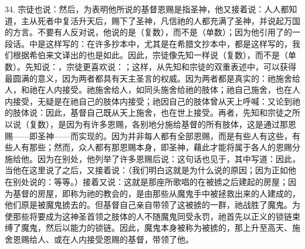 34. 宗徒也说：然后，为表明他所说的基督恩赐是指圣神，他又接着说：人人都知道，主从死者中复活升天后，赐下了圣神，凡信祂的人都充满了圣神，并说起万国的方言。不要有人反对说，他说的是（复数），而不是（单数）；因为他引用了的一段话。中是这样写的：在许多抄本中，尤其是在希腊文抄本中，都是这样写的，我们根据希伯来文译出的也是如此。因此，宗徒像先知一样说（复数），而不是（单数）。先知说：，宗徒更喜欢说：；这样，从先知和宗徒的双重表述中，可以获得最圆满的意义，因为两者都具有天主圣言的权威。因为两者都是真实的：祂施舍给人，和祂在人内接受。祂施舍给人，如同头施舍给祂的肢体；祂自己施舍，也在人内接受，无疑是在祂自己的肢体内接受；祂因自己的肢体曾从天上呼喊：又论到祂的肢体说：因此，基督自己既从天上施舍，也在世上接受。再者，先知和宗徒之所以说（复数），是因为有许多恩赐，各别地分施给基督的所有肢体，这是通过那恩赐——即圣神——而实现的。因为并非每人都有全部恩赐，而是有些人有这些，有些人有那些；然而，众人都有那恩赐本身，即圣神，藉此才能将属于各人的恩赐分施给他。因为在别处，他列举了许多恩赐后说：这句话也见于，其中写道：因此，当他在这里说了之后，又接着说：（我们明白这就是为什么说的原因；因为正如他在别处说的：等等。）接着又说：这就是那座所歌唱的在被掳之后建起的房屋；因为基督的房屋，即称为祂的教会的，是由那些从魔鬼手中被拯救出来的人建成的，他们原是被魔鬼掳去的。但基督自己亲自带领了这被掳的一群，祂战胜了魔鬼。为使那些将要成为这神圣首领之肢体的人不随魔鬼同受永罚，祂首先以正义的锁链束缚了魔鬼，然后以能力的锁链。因此，魔鬼本身被称为被掳的，那上升至高天、施舍恩赐给人、或在人内接受恩赐的基督，带领了他。\par

